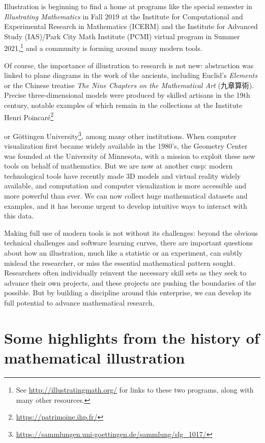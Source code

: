 \documentclass{notices}
\begin{document}
Illustration is beginning to find a home at programs like the special semester in \emph{Illustrating Mathematics} in Fall 2019 at the Institute for Computational and Experimental Research in Mathematics (ICERM) and the Institute for Advanced Study (IAS)/Park City Math Institute (PCMI) virtual program in Summer 2021,\footnote{See \url{http://illustratingmath.org/} for links to these two programs, along with many other resources.} and a community is forming around many modern tools.
\begin{CJK*}{UTF8}{bsmi}
Of course, the importance of illustration to research is not new:  abstraction was linked to plane diagrams in the work of the ancients, including Euclid's \emph{Elements} or the Chinese treatise \emph{The Nine Chapters on the Mathematical Art} (九章算術). Precise three-dimensional models were produced by skilled artisans in the 19th century, notable examples of which remain in the collections at the Institute Henri Poincaré\footnote{\url{https://patrimoine.ihp.fr/}}~\cite{Villani:OM}
\end{CJK*}
or G\"ottingen University\footnote{\url{https://sammlungen.uni-goettingen.de/sammlung/slg_1017/}}, among many other institutions. When computer visualization first became widely available in the 1980's, the Geometry Center was founded at the University of Minnesota, with a mission to exploit these new tools on behalf of mathematics. 
But we are now at another cusp:  modern technological tools have recently made 3D models and virtual reality widely available, and computation and computer visualization is more accessible and more powerful than ever.  We can now collect huge mathematical datasets and examples, and it has become urgent to develop intuitive ways to interact with this data.  

Making full use of modern tools is not without its challenges:  beyond the obvious technical challenges and software learning curves, there are important questions about how an illustration, much like a statistic or an experiment, can subtly mislead the researcher, or miss the essential mathematical pattern sought. Researchers often individually reinvent the necessary skill sets as they seek to advance their own projects, and these projects are pushing the boundaries of the possible. 
But by building a discipline around this enterprise, we can develop its full potential to advance mathematical research.

\section*{Some highlights from the history of mathematical illustration}
\end{document}
